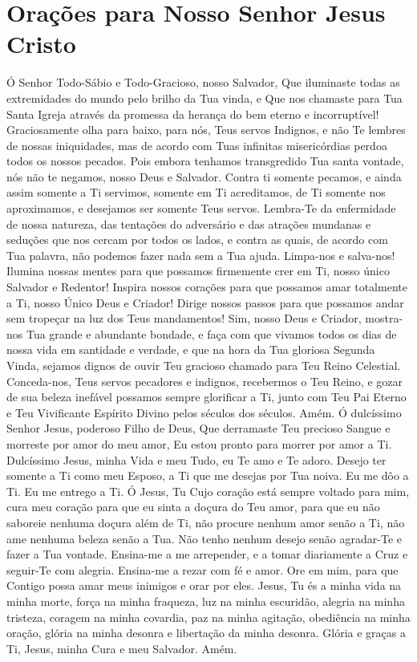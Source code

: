 \documentclass{subfiles}
\begin{document}

\section{Orações para Nosso Senhor Jesus Cristo}

Ó Senhor Todo-Sábio e Todo-Gracioso, nosso Salvador, Que iluminaste todas as
extremidades do mundo pelo brilho da Tua vinda, e Que nos chamaste para Tua
Santa Igreja através da promessa da herança do bem eterno e incorruptível!
Graciosamente olha para baixo, para nós, Teus servos Indignos, e não Te lembres
de nossas iniquidades, mas de acordo com Tuas infinitas misericórdias perdoa
todos os nossos pecados. Pois embora tenhamos transgredido Tua santa vontade,
nós não te negamos, nosso Deus e Salvador. Contra ti somente pecamos, e ainda
assim somente a Ti servimos, somente em Ti acreditamos, de Ti somente nos
aproximamos, e desejamos ser somente Teus servos. Lembra-Te da enfermidade de
nossa natureza, das tentações do adversário e das atrações mundanas e seduções
que nos cercam por todos os lados, e contra as quais, de acordo com Tua palavra,
não podemos fazer nada sem a Tua ajuda. Limpa-nos e salva-nos! Ilumina nossas
mentes para que possamos firmemente crer em Ti, nosso único Salvador e Redentor!
Inspira nossos corações para que possamos amar totalmente a Ti, nosso Único Deus
e Criador! Dirige nossos passos para que possamos andar sem tropeçar na luz dos
Teus mandamentos! Sim, nosso Deus e Criador, mostra-nos Tua grande e abundante
bondade, e faça com que vivamos todos os dias de nossa vida em santidade e
verdade, e que na hora da Tua gloriosa Segunda Vinda, sejamos dignos de ouvir
Teu gracioso chamado para Teu Reino Celestial. Conceda-nos, Teus servos
pecadores e indignos, recebermos o Teu Reino, e gozar de sua beleza inefável
possamos sempre glorificar a Ti, junto com Teu Pai Eterno e Teu Vivificante
Espírito Divino pelos séculos dos séculos. Amém. Ó dulcíssimo Senhor Jesus,
poderoso Filho de Deus, Que derramaste Teu precioso Sangue e morreste por amor
do meu amor, Eu estou pronto para morrer por amor a Ti. Dulcíssimo Jesus, minha
Vida e meu Tudo, eu Te amo e Te adoro. Desejo ter somente a Ti como meu Esposo,
a Ti que me desejas por Tua noiva. Eu me dôo a Ti. Eu me entrego a Ti. Ó Jesus,
Tu Cujo coração está sempre voltado para mim, cura meu coração para que eu sinta
a doçura do Teu amor, para que eu não saboreie nenhuma doçura além de Ti, não
procure nenhum amor senão a Ti, não ame nenhuma beleza senão a Tua. Não tenho
nenhum desejo senão agradar-Te e fazer a Tua vontade. Ensina-me a me arrepender,
e a tomar diariamente a Cruz e seguir-Te com alegria. Ensina-me a rezar com fé e
amor. Ore em mim, para que Contigo possa amar meus inimigos e orar por eles.
Jesus, Tu és a minha vida na minha morte, força na minha fraqueza, luz na minha
escuridão, alegria na minha tristeza, coragem na minha covardia, paz na minha
agitação, obediência na minha oração, glória na minha desonra e libertação da
minha desonra. Glória e graças a Ti, Jesus, minha Cura e meu Salvador. Amém.
\end{document}
